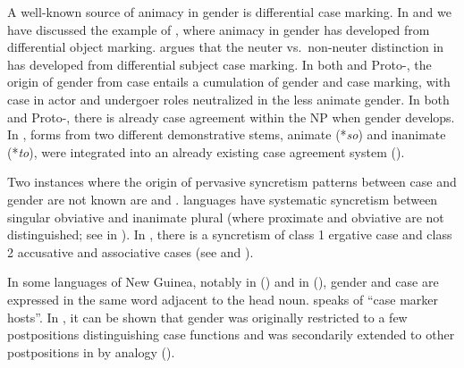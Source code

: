 \documentclass[output=collectionpaper]{langsci/langscibook}
\begin{document}
A well-known source of animacy in gender is differential case marking. In  and  we have discussed the example of , where animacy in gender has developed from differential object marking. \cite[456]{Luraghi2011} argues that the neuter vs.\ non-neuter distinction in  has developed from differential subject case marking. In both  and Proto-, the origin of gender from case entails a cumulation of gender and case marking, with case in actor and undergoer roles neutralized in the less animate gender. In both  and Proto-, there is already case agreement within the NP when gender develops. In , forms from two different demonstrative stems, animate (*\textit{so}) and inanimate (*\textit{to}), were integrated into an already existing case agreement system (\citealt[456]{Luraghi2011}).

Two instances where the origin of pervasive syncretism patterns between case and gender are not known are  and .  languages have systematic syncretism between singular obviative and inanimate plural (where proximate and obviative are not distinguished; see  in ). In , there is a syncretism of class 1 ergative case and class 2 accusative and associative cases (see  and ).

In some languages of New Guinea, notably in  () and in  (), gender and case are expressed in the same word adjacent to the head noun.  speaks of ``case marker hosts''. In , it can be shown that gender was originally restricted to a few postpositions distinguishing case functions and was secondarily extended to other postpositions in  by analogy (\citealt{Waelchli2018}).
\end{document}
